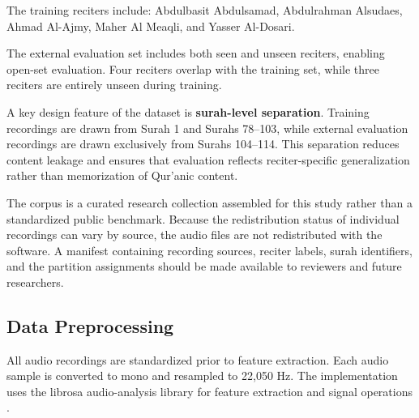 \documentclass[conference]{IEEEtran}
\begin{document}
The training reciters include: Abdulbasit Abdulsamad, Abdulrahman Alsudaes, Ahmad Al-Ajmy, Maher Al Meaqli, and Yasser Al-Dosari.

The external evaluation set includes both seen and unseen reciters, enabling open-set evaluation. Four reciters overlap with the training set, while three reciters are entirely unseen during training.

A key design feature of the dataset is \textbf{surah-level separation}. Training recordings are drawn from Surah 1 and Surahs 78--103, while external evaluation recordings are drawn exclusively from Surahs 104--114. This separation reduces content leakage and ensures that evaluation reflects reciter-specific generalization rather than memorization of Qur'anic content.

The corpus is a curated research collection assembled for this study rather than a standardized public benchmark. Because the redistribution status of individual recordings can vary by source, the audio files are not redistributed with the software. A manifest containing recording sources, reciter labels, surah identifiers, and the partition assignments should be made available to reviewers and future researchers.

\begin{table}[t]
\centering
\caption{Dataset partitions used in the experimental evaluation.}
\label{table1}
\renewcommand{\arraystretch}{1.2}
\setlength{\tabcolsep}{6pt}
\end{table}

\subsection{Data Preprocessing}

All audio recordings are standardized prior to feature extraction. Each audio sample is converted to mono and resampled to 22,050 Hz. The implementation uses the librosa audio-analysis library for feature extraction and signal operations \cite{librosa}.
\end{document}
